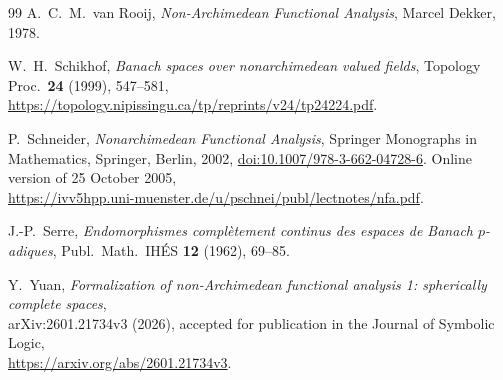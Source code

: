 \begin{thebibliography}{99}
 A.~C.~M.~van Rooij, \emph{Non-Archimedean Functional Analysis}, Marcel Dekker, 1978.

 W.~H.~Schikhof, \emph{Banach spaces over nonarchimedean valued fields}, Topology Proc.\
\textbf{24} (1999), 547--581,\\
{\small\url{https://topology.nipissingu.ca/tp/reprints/v24/tp24224.pdf}}.

 P.~Schneider, \emph{Nonarchimedean Functional Analysis}, Springer Monographs in Mathematics,
Springer, Berlin, 2002, \href{https://doi.org/10.1007/978-3-662-04728-6}{doi:10.1007/978-3-662-04728-6}.
Online version of 25 October 2005,\\
{\small\url{https://ivv5hpp.uni-muenster.de/u/pschnei/publ/lectnotes/nfa.pdf}}.

 J.-P.~Serre, \emph{Endomorphismes compl\`etement continus des espaces de Banach $p$\nobreakdash-adiques}, Publ.\ Math.\
IH\'ES \textbf{12} (1962), 69--85.

 Y.~Yuan, \emph{Formalization of non-Archimedean functional analysis 1: spherically complete spaces},\\
arXiv:2601.21734v3 (2026), accepted for publication in the Journal of Symbolic Logic,\\
{\small\url{https://arxiv.org/abs/2601.21734v3}}.

\end{thebibliography}
